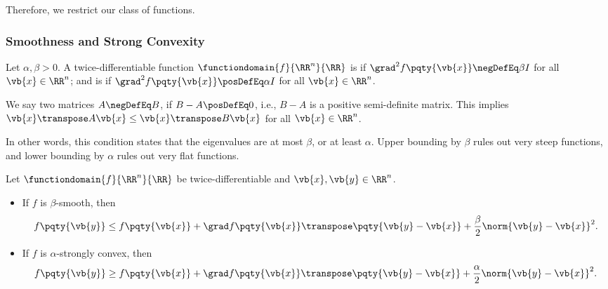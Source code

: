 Therefore, we restrict our class of functions.

\subsubsection{Smoothness and Strong Convexity}

\begin{definition}
    \label{def:alpha-sc-beta-smooth}%
    Let \(\alpha, \beta > 0\). A twice-differentiable function \(\functiondomain{f}{\RR^n}{\RR}\) is  if \(\grad^2 f\pqty{\vb{x}} \negDefEq \beta I\) for all \(\vb{x} \in \RR^n\); and is  if \(\grad^2 f\pqty{\vb{x}} \posDefEq \alpha I\) for all \(\vb{x} \in \RR^n\).
\end{definition}

\begin{remark}
    We say two matrices \(A \negDefEq B\), if \(B - A \posDefEq 0\), i.e., \(B - A\) is a positive semi-definite matrix. This implies \(\vb{x}\transpose A \vb{x} \leq \vb{x} \transpose B \vb{x}\) for all \(\vb{x} \in \RR^n\).
\end{remark}

In other words, this condition states that the eigenvalues are at most \(\beta\), or at least \(\alpha\). Upper bounding by \(\beta\) rules out very steep functions, and lower bounding by \(\alpha\) rules out very flat functions.

\begin{theorem}
    \label{thm:second-order-quadratic-bounds}%
    Let \(\functiondomain{f}{\RR^n}{\RR}\) be twice-differentiable and \(\vb{x}, \vb{y} \in \RR^n\).

    \begin{itemize}
        \item If \(f\) is \(\beta\)-smooth, then
        \[
            f\pqty{\vb{y}} \leq f\pqty{\vb{x}} + \grad f\pqty{\vb{x}}\transpose \pqty{\vb{y} - \vb{x}} + \frac{\beta}{2} \norm{\vb{y} - \vb{x}}^2.
        \]

        \item If \(f\) is \(\alpha\)-strongly convex, then
        \[
            f\pqty{\vb{y}} \geq f\pqty{\vb{x}} + \grad f\pqty{\vb{x}}\transpose \pqty{\vb{y} - \vb{x}} + \frac{\alpha}{2} \norm{\vb{y} - \vb{x}}^2.
        \]
    \end{itemize}
\end{theorem}

